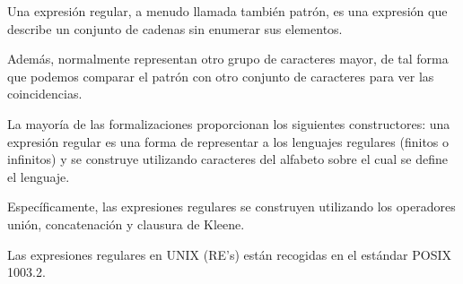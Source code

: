 Una expresión regular,
a menudo llamada también patrón,
es una expresión que describe un conjunto de cadenas sin enumerar sus elementos.

Además,
normalmente representan otro grupo de caracteres mayor,
de tal forma que podemos comparar el patrón con otro conjunto de caracteres para ver las coincidencias.

La mayoría de las formalizaciones proporcionan los siguientes constructores:
una expresión regular es una forma de representar a los lenguajes regulares
(finitos o infinitos) y se construye utilizando caracteres del alfabeto
sobre el cual se define el lenguaje.

Específicamente,
las expresiones regulares se construyen utilizando los operadores
unión, concatenación y clausura de Kleene.

Las expresiones regulares en UNIX (RE's) están recogidas en el estándar POSIX 1003.2.

